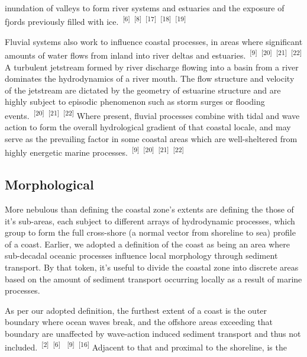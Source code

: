 \documentclass{article}
\begin{document}
\newpage

\par{\noindent inundation of valleys to form river systems and estuaries and the exposure of fjords previously filled with ice.~\textsuperscript{[6]}~\textsuperscript{[8]}~\textsuperscript{[17]}~\textsuperscript{[18]}~\textsuperscript{[19]}}

\par{Fluvial systems also work to influence coastal processes, in areas where significant amounts of water flows from inland into river deltas and estuaries.~\textsuperscript{[9]}~\textsuperscript{[20]}~\textsuperscript{[21]}~\textsuperscript{[22]} A turbulent jetstream formed by river discharge flowing into a basin from a river dominates the hydrodynamics of a river mouth. The flow structure and velocity of the jetstream are dictated by the geometry of estuarine structure and are highly subject to episodic phenomenon such as storm surges or flooding events.~\textsuperscript{[20]}~\textsuperscript{[21]}~\textsuperscript{[22]} Where present, fluvial processes combine with tidal and wave action to form the overall hydrological gradient of that coastal locale, and may serve as the prevailing factor in some coastal areas which are well-sheltered from highly energetic marine processes.~\textsuperscript{[9]}~\textsuperscript{[20]}~\textsuperscript{[21]}~\textsuperscript{[22]}}

\subsection{Morphological}

\par{\hspace{.5cm}More nebulous than defining the coastal zone's extents are defining the those of it's sub-areas, each subject to different arrays of hydrodynamic processes, which group to form the full cross-shore (a normal vector from shoreline to sea) profile of a coast. Earlier, we adopted a definition of the coast as being an area where sub-decadal oceanic processes influence local morphology through sediment transport. By that token, it's useful to divide the coastal zone into discrete areas based on the amount of sediment transport occurring locally as a result of marine processes.} 

\par{As per our adopted definition, the furthest extent of a coast is the outer boundary where ocean waves break, and the offshore areas exceeding that boundary are unaffected by wave-action induced sediment transport and thus not included.~\textsuperscript{[2]}~\textsuperscript{[6]}  ~\textsuperscript{[9]}~\textsuperscript{[16]} Adjacent to that and proximal to the shoreline, is the}
\end{document}
